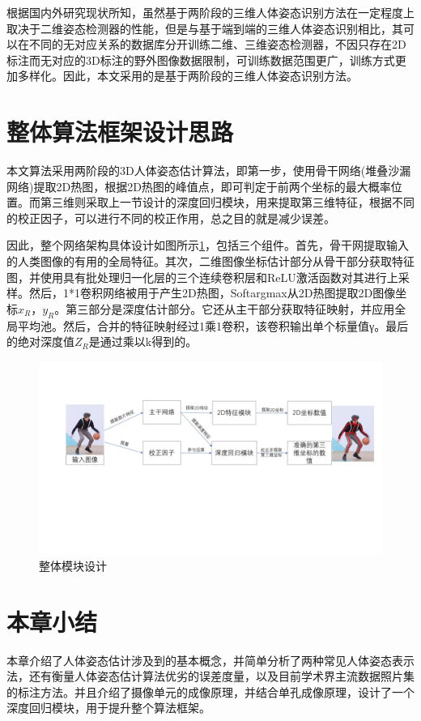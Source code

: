 根据国内外研究现状所知，虽然基于两阶段的三维人体姿态识别方法在一定程度上取决于二维姿态检测器的性能，但是与基于端到端的三维人体姿态识别相比，其可以在不同的无对应关系的数据库分开训练二维、三维姿态检测器，不因只存在2D标注而无对应的3D标注的野外图像数据限制，可训练数据范围更广，训练方式更加多样化。因此，本文采用的是基于两阶段的三维人体姿态识别方法。

\section{整体算法框架设计思路}

本文算法采用两阶段的3D人体姿态估计算法，即第一步，使用骨干网络(堆叠沙漏网络)提取2D热图，根据2D热图的峰值点，即可判定于前两个坐标的最大概率位置。而第三维则采取上一节设计的深度回归模块，用来提取第三维特征，根据不同的校正因子，可以进行不同的校正作用，总之目的就是减少误差。
 
因此，整个网络架构具体设计如图所示\ref{depth_model}，包括三个组件。首先，骨干网提取输入的人类图像的有用的全局特征。其次，二维图像坐标估计部分从骨干部分获取特征图，并使用具有批处理归一化层的三个连续卷积层和ReLU激活函数对其进行上采样。然后，1*1卷积网络被用于产生2D热图，Softargmax从2D热图提取2D图像坐标$x_R，y_R$。第三部分是深度估计部分。它还从主干部分获取特征映射，并应用全局平均池。然后，合并的特征映射经过1乘1卷积，该卷积输出单个标量值γ。最后的绝对深度值$Z_R$是通过乘以k得到的。

\begin{figure}[h]
	\includegraphics[width=\textwidth]{pic/depth_model.jpg}
	\caption{整体模块设计}
	\label{depth_model}
\end{figure}

\section{本章小结}
本章介绍了人体姿态估计涉及到的基本概念，并简单分析了两种常见人体姿态表示法，还有衡量人体姿态估计算法优劣的误差度量，以及目前学术界主流数据照片集的标注方法。并且介绍了摄像单元的成像原理，并结合单孔成像原理，设计了一个深度回归模块，用于提升整个算法框架。